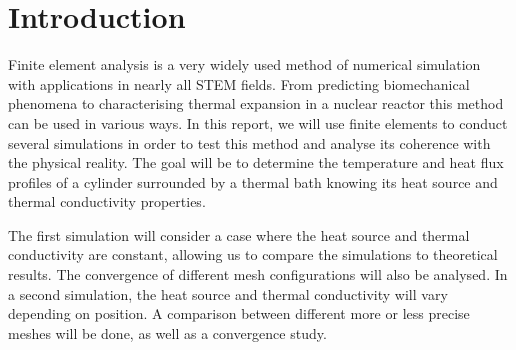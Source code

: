 \section{Introduction}

Finite element analysis is a very widely used method of numerical simulation with applications in nearly all STEM fields. From predicting biomechanical phenomena \cite{body} to characterising thermal expansion in a nuclear reactor \cite{nuke} this method can be used in various ways. In this report, we will use finite elements to conduct several simulations in order to test this method and analyse its coherence with the physical reality. The goal will be to determine the temperature and heat flux profiles of a cylinder surrounded by a thermal bath knowing its heat source and thermal conductivity properties.

The first simulation will consider a case where the heat source and thermal conductivity are constant, allowing us to compare the simulations to theoretical results. The convergence of different mesh configurations will also be analysed. In a second simulation, the heat source and thermal conductivity will vary depending on position. A comparison between different more or less precise meshes will be done, as well as a convergence study.

